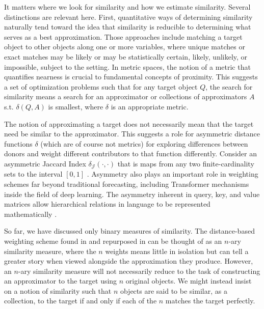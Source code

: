 \documentclass[11pt]{article}
\theoremstyle{definition}
\begin{document}
It matters where we look for similarity and how we estimate similarity.  Several distinctions are relevant here.  First, quantitative ways of determining similarity naturally tend toward the idea that similarity is reducible to determining what serves as a best approximation.  Those approaches include matching a target object to other objects along one or more variables, where unique matches or exact matches may be likely or may be statistically certain, likely, unlikely, or impossible, subject to the setting.  In metric spaces, the notion of a metric that quantifies nearness is crucial to fundamental concepts of proximity.  This suggests a set of optimization problems such that for any target object $Q$, the search for similarity means a search for an approximator or collections of approximators $A$ s.t. $\delta(Q,A)$ is smallest, where $\delta$ is an appropriate metric.

The notion of approximating a target does not necessarily mean that the target need be similar to the approximator.  This suggests a role for asymmetric distance functions $\delta$ (which are of course not metrics) for exploring differences between donors and weight different contributors to that function differently.  Consider an asymmetric Jaccard Index $\delta_{\mathcal{J}}(\cdot,\cdot)$ that is maps from any two finite-cardinality sets to the interval $[0,1]$ \citep{garg2015asymmetric}.  Asymmetry also plays an important role in weighting schemes far beyond traditional forecasting, including Transformer mechanisms inside the field of deep learning.  The asymmetry inherent in query, key, and value matrices allow hierarchical relations in language to be represented mathematically \citep[p. 364]{bishop2023deep}.  

So far, we have discussed only binary measures of similarity.  The distance-based weighting scheme found in \cite{lin2021minimizing} and repurposed in \cite{lundquist2024volatility} can be thought of as an $n$-ary similarity measure, where the $n$ weights means little in isolation but can tell a greater story when viewed alongside the approximation they produce.  However, an $n$-ary similarity measure will not necessarily reduce to the task of constructing an approximator to the target using $n$ original objects.  We might instead insist on a notion of similarity such that $n$ objects are said to be similar, as a collection, to the target if and only if each of the $n$ matches the target perfectly.
\end{document}
